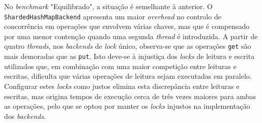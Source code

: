 \documentclass[11pt, a4paper]{article}
\begin{document}
No \emph{benchmark} "Equilibrado"{}, a situação é semelhante à anterior. O
\texttt{ShardedHashMapBackend} apresenta um maior \emph{overhead} no controlo de concorrência em
operações que envolvem várias chaves, mas que é compensado por uma menor contenção quando uma
segunda \emph{thread} é introduzida. A partir de quatro \emph{threads}, nos \emph{backends} de
\emph{lock} único, observa-se que as operações \texttt{get} são mais demoradas que as \texttt{put}.
Isto deve-se à injustiça dos \emph{locks} de leitura e escrita utilizados que, em combinação com uma
maior competição entre leituras e escritas, dificulta que várias operações de leitura sejam
executadas em paralelo. Configurar estes \emph{locks} como justos elimina esta discrepância entre
leituras e escritas, mas origina tempos de execução cerca de três vezes maiores para ambas as
operações, pelo que se optou por manter os \emph{locks} injustos na implementação dos
\emph{backends}.
\end{document}
